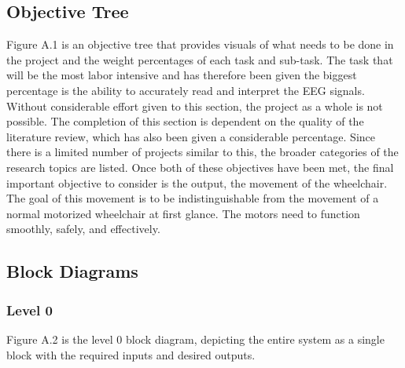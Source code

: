 \documentclass[conference]{IEEEtran}
\begin{document}
    \subsection{Objective Tree}
    Figure A.1 is an objective tree that provides visuals of what needs to be done in the project and the weight percentages of each task and sub-task. The task that will be the most labor intensive and has therefore been given the biggest percentage is the ability to accurately read and interpret the EEG signals. Without considerable effort given to this section, the project as a whole is not possible. The completion of this section is dependent on the quality of the literature review, which has also been given a considerable percentage. Since there is a limited number of projects similar to this, the broader categories of the research topics are listed. Once both of these objectives have been met, the final important objective to consider is the output, the movement of the wheelchair. The goal of this movement is to be indistinguishable from the movement of a normal motorized wheelchair at first glance. The motors need to function smoothly, safely, and effectively.
    
    
    
    \subsection{Block Diagrams}
        \subsubsection{Level 0}
        Figure A.2 is the level 0 block diagram, depicting the entire system as a single block with the required inputs and desired outputs. 
\end{document}
